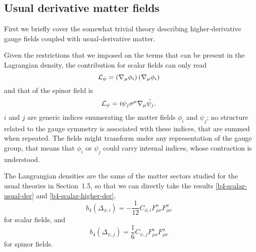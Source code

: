 \subsection{Usual derivative matter fields}


First we briefly cover the somewhat trivial theory describing higher-derivative gauge fields coupled with usual-derivative matter.

Given the restrictions that we imposed on the terms that can be present in the Lagrangian density, the contribution for scalar fields can only read
\begin{equation}
{ \mathcal{L} }_\phi = 
	\left( { \mathcal{\nabla} }_\mu \phi_i \right) \left( { \mathcal{\nabla} }_\mu \phi_i \right) 
\end{equation}
and that of the spinor field is
\begin{equation}
{ \mathcal{L} }_\psi = 
	i \psi_j \sigma^\mu { \mathcal{\nabla} }_\mu \bar \psi_j.
\end{equation}
$i$ and $j$ are generic indices enumerating the matter fields $\phi_i$ and $\psi_j$; no  structure related to the gauge symmetry is associated with these indices, that are summed when repeated. The fields might transform under any representation of the gauge group, that means that $\phi_i$ or $\psi_j$ could carry internal indices, whose contraction is understood.

The Langrangian densities are the same of the matter sectors studied for the usual \ym{} theories in Section~1.5, so that we can directly take the results \eqref{b4-scalar-usual-der} and \eqref{b4-scalar-higher-der}, \ie  
\begin{equation}
b_4( \Delta_{\phi,i} ) = - \frac{1 }{12}  C_{\phi,i} F^a_{\mu\nu} F^a_{\mu\nu} 
\end{equation}
for scalar fields, and
\begin{equation}
b_4( \Delta_{\psi,j} ) = \frac{1}{6} C_{\psi,j} F_{\mu\nu}^a F_{\mu\nu}^a  
\end{equation}
for spinor fields.



